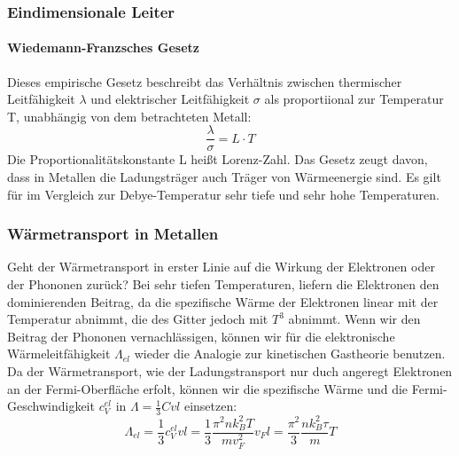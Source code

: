 \documentclass[11pt]{article}
\begin{document}
\subsubsection{Eindimensionale Leiter}


\noindent \paragraph{Wiedemann-Franzsches Gesetz}
Dieses empirische Gesetz beschreibt das Verhältnis zwischen thermischer
Leitfähigkeit $\lambda$ und elektrischer Leitfähigkeit $\sigma$ als
proportiional zur Temperatur T, unabhängig von dem betrachteten Metall:
\begin{equation}
  \frac{\lambda}{\sigma}=L\cdot T
\end{equation}
Die Proportionalitätskonstante L heißt Lorenz-Zahl. Das Gesetz zeugt davon, dass
in Metallen die Ladungsträger auch Träger von Wärmeenergie sind. Es gilt für
im Vergleich zur Debye-Temperatur sehr tiefe und sehr hohe Temperaturen.

\subsubsection{Wärmetransport in Metallen}
Geht der Wärmetransport in erster Linie auf die Wirkung der Elektronen oder der
Phononen zurück? Bei sehr tiefen Temperaturen, liefern die Elektronen den
dominierenden Beitrag, da die spezifische Wärme der Elektronen linear mit der
Temperatur abnimmt, die des Gitter jedoch mit $T^3$ abnimmt. Wenn wir den
Beitrag der Phononen vernachlässigen, können wir für die elektronische
Wärmeleitfähigkeit $\Lambda_{el}$ wieder die Analogie zur kinetischen Gastheorie
benutzen. Da der Wärmetransport, wie der Ladungstransport nur duch angeregt
Elektronen an der Fermi-Oberfläche erfolt, können wir die spezifische Wärme und
die Fermi-Geschwindigkeit $c_V^{el}$ in $\Lambda=\frac{1}{3}Cvl$ einsetzen:
\begin{equation}
  \Lambda_{el}=\frac{1}{3}c_V^{el}vl=\frac{1}{3}\frac{\pi^2nk_B^2T}{mv_F^2}v_Fl
  =\frac{\pi^2}{3}\frac{nk_B^2\tau}{m}T
\end{equation}
\end{document}
